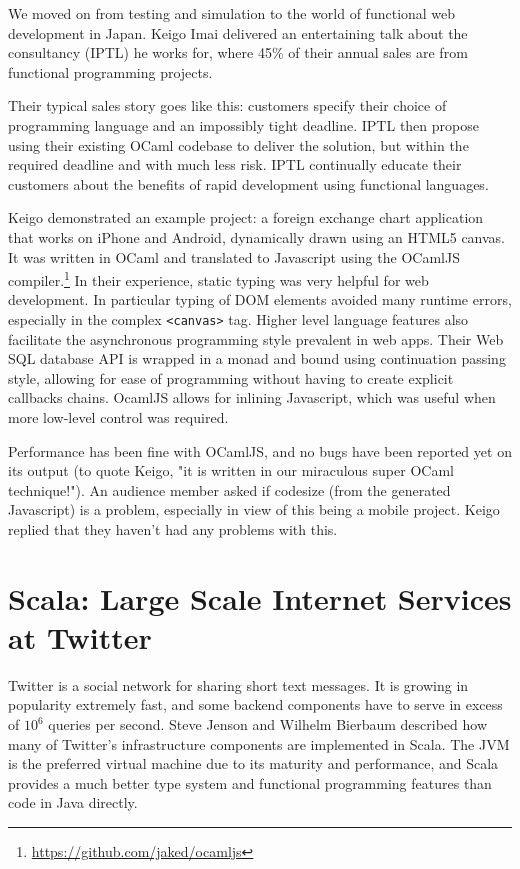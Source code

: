 \documentclass{jfp1}
\begin{document}
We moved on from testing and simulation to the world of functional web
development in Japan. Keigo Imai delivered an entertaining talk about the
consultancy (IPTL) he works for, where 45\% of their annual sales are from
functional programming projects.

Their typical sales story goes like this: customers specify their choice of
programming language and an impossibly tight deadline.  IPTL then propose using
their existing OCaml codebase to deliver the solution, but within the required
deadline and with much less risk.  IPTL continually educate their customers
about the benefits of rapid development using functional languages.

Keigo demonstrated an example project: a foreign exchange chart application
that works on iPhone and Android, dynamically drawn using an HTML5 canvas.  It
was written in OCaml and translated to Javascript using the OCamlJS
compiler.\footnote{\url{https://github.com/jaked/ocamljs}}  In their
experience, static typing was very helpful for web development.  In particular
typing of DOM elements avoided many runtime errors, especially in the complex
{\tt <canvas>} tag.  Higher level language features also facilitate the
asynchronous programming style prevalent in web apps.  Their Web SQL database
API is wrapped in a monad and bound using continuation passing style, allowing
for ease of programming without having to create explicit callbacks chains.
OcamlJS allows for inlining Javascript, which was useful when more low-level
control was required.

Performance has been fine with OCamlJS, and no bugs have been reported yet on
its output (to quote Keigo, "it is written in our miraculous super OCaml
technique!"). An audience member asked if codesize (from the generated
Javascript) is a problem, especially in view of this being a mobile project.
Keigo replied that they haven't had any problems with this.

\section{Scala: Large Scale Internet Services at Twitter}

Twitter is a social network for sharing short text messages. It is growing in
popularity extremely fast, and some backend components have to serve in excess
of $10^6$ queries per second.  Steve Jenson and Wilhelm Bierbaum described how
many of Twitter's infrastructure components are implemented in Scala.  The JVM
is the preferred virtual machine due to its maturity and performance, and Scala
provides a much better type system and functional programming features than
code in Java directly.
\end{document}
